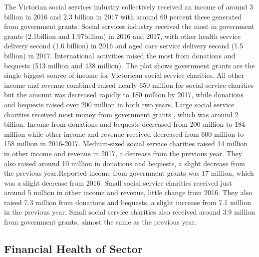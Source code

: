 \documentclass[
  11pt,
]{article}
\begin{document}
The Victorian social services industry collectively received an income of around 3 billion in 2016 and 2.3 billion in 2017 with around 60 percent these generated from government grants.
Social services industry received the most in government grants (2.1billion and 1.97billion) in 2016 and 2017, with other health service delivery second (1.6 billion) in 2016 and aged care service delivery second (1.5 billion) in 2017. International activities raised the most from donations and bequests (513 million and 438 million).
The plot shows government grants are the single biggest source of income for Victorican social service charities. All other income and revenue combined raised nearly 650 million for social service charities but the amount was decreased rapidly to 180 million by 2017, while donations and bequests raised over 200 million in both two years.
Large social service charities received most money from government grants , which was around 2 billion. Income from donations and bequests decreased from 200 million to 184 million while other income and revenue received decreased from 600 million to 158 million in 2016-2017.
Medium-sized social service charities raised 14 million in other income and revenue in 2017, a decrease from the previous year. They also raised around 10 million in donations and bequests, a slight decrease from the previous year.Reported income from government grants was 17 million, which was a slight decrease from 2016.
Small social service charities received just around 5 million in other income and revenue, little change from 2016. They also raised 7.3 million from donations and bequests, a slight increase from 7.1 million in the previous year. Small social service charities also received around 3.9 million from government grants, almost the same as the previous year.

\hypertarget{financial-health-of-sector}{%
\subsection{Financial Health of Sector}\label{financial-health-of-sector}}
\end{document}
